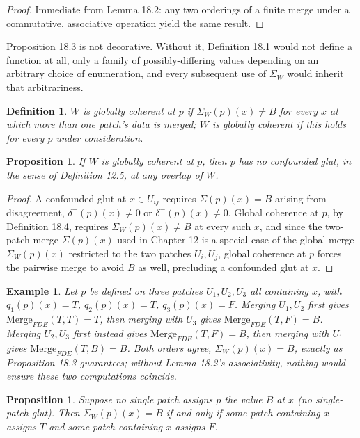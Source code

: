 \documentclass[11pt]{book}
\newtheorem{definition}[theorem]{Definition}
\newtheorem{proposition}[theorem]{Proposition}
\newtheorem{example}[theorem]{Example}
\begin{document}
\begin{proof}
Immediate from Lemma 18.2: any two orderings of a finite merge under a commutative, associative operation yield the same result.
\end{proof}

Proposition 18.3 is not decorative. Without it, Definition 18.1 would not define a function at all, only a family of possibly-differing values depending on an arbitrary choice of enumeration, and every subsequent use of $\Sigma_W$ would inherit that arbitrariness.

\begin{definition}
$W$ is \emph{globally coherent} at $p$ if $\Sigma_W(p)(x) \neq B$ for every $x$ at which more than one patch's data is merged; $W$ is globally coherent if this holds for every $p$ under consideration.
\end{definition}

\begin{proposition}
If $W$ is globally coherent at $p$, then $p$ has no confounded glut, in the sense of Definition 12.5, at any overlap of $W$.
\end{proposition}

\begin{proof}
A confounded glut at $x \in U_{ij}$ requires $\Sigma(p)(x) = B$ arising from disagreement, $\delta^+(p)(x) \neq 0$ or $\delta^-(p)(x) \neq 0$. Global coherence at $p$, by Definition 18.4, requires $\Sigma_W(p)(x) \neq B$ at every such $x$, and since the two-patch merge $\Sigma(p)(x)$ used in Chapter 12 is a special case of the global merge $\Sigma_W(p)(x)$ restricted to the two patches $U_i, U_j$, global coherence at $p$ forces the pairwise merge to avoid $B$ as well, precluding a confounded glut at $x$.
\end{proof}

\begin{example}
Let $p$ be defined on three patches $U_1,U_2,U_3$ all containing $x$, with $q_1(p)(x)=T$, $q_2(p)(x)=T$, $q_3(p)(x)=F$. Merging $U_1,U_2$ first gives $\mathrm{Merge}_{FDE}(T,T)=T$, then merging with $U_3$ gives $\mathrm{Merge}_{FDE}(T,F)=B$. Merging $U_2,U_3$ first instead gives $\mathrm{Merge}_{FDE}(T,F)=B$, then merging with $U_1$ gives $\mathrm{Merge}_{FDE}(T,B)=B$. Both orders agree, $\Sigma_W(p)(x)=B$, exactly as Proposition 18.3 guarantees; without Lemma 18.2's associativity, nothing would ensure these two computations coincide.
\end{example}

\begin{proposition}
Suppose no single patch assigns $p$ the value $B$ at $x$ (no single-patch glut). Then $\Sigma_W(p)(x) = B$ if and only if some patch containing $x$ assigns $T$ and some patch containing $x$ assigns $F$.
\end{proposition}
\end{document}
